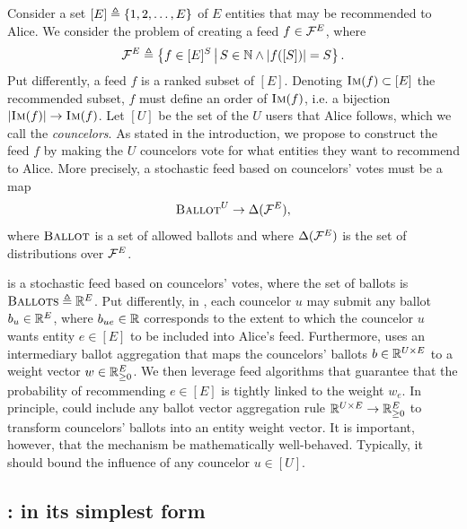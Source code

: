 \section{\Veche{}}
\label{sec:model}

Consider a set $[E] \triangleq \left\lbrace 1, 2, \ldots, E \right\rbrace$ of $E$ entities 
that may be recommended to Alice.
We consider the problem of creating a feed $f \in \mathcal F^E$,
where
\begin{align}
    \mathcal F^E \triangleq \left\lbrace 
        f \in [E]^S \,\middle|\, 
        S \in \mathbb N \wedge \left\lvert{f([S])}\right\rvert = S
     \right\rbrace.
\end{align}
Put differently, a feed $f$ is a ranked subset of $[E]$.
Denoting $\textsc{Im}(f) \subset [E]$ the recommended subset,
$f$ must define an order of $\textsc{Im}(f)$, 
i.e. a bijection $\left\lvert{\textsc{Im}(f)}\right\rvert \to \textsc{Im}(f)$.
Let $[U]$ be the set of the $U$ users that Alice follows,
which we call the \emph{councelors}.
As stated in the introduction, 
we propose to construct the feed $f$
by making the $U$ councelors vote 
for what entities they want to recommend to Alice.
More precisely, a stochastic feed based on councelors' votes must be a map
\begin{align}
    \textsc{Ballot}^U \to \Delta(\mathcal F^E),
\end{align}
where $\textsc{Ballot}$ is a set of allowed ballots
and where $\Delta(\mathcal F^E)$ is the set of distributions over $\mathcal F^E$.

\Veche{} is a stochastic feed based on councelors' votes,
where the set of ballots is $\textsc{Ballots} \triangleq \mathbb R^E$.
Put differently, in \Veche{}, each councelor $u$ may submit any ballot $b_u \in \mathbb R^E$,
where $b_{ue} \in \mathbb R$ corresponds to the extent to which 
the councelor $u$ wants entity $e \in [E]$ to be included into Alice's feed.
Furthermore, \Veche{} uses an intermediary ballot aggregation
that maps the councelors' ballots $b \in \mathbb R^{U \times E}$
to a weight vector $w \in \mathbb R^E_{\geq 0}$.
We then leverage feed algorithms that guarantee
that the probability of recommending $e \in [E]$ is tightly linked to the weight $w_e$.
In principle, \Veche{} could include any ballot vector aggregation rule
$\mathbb R^{U \times E} \to \mathbb R^E_{\geq 0}$ to transform councelors' ballots into an entity weight vector.
It is important, however, that the mechanism be mathematically well-behaved.
Typically, it should bound the influence of any councelor $u \in [U]$.


\subsection{\SimpleVeche{}: \Veche{} in its simplest form}

